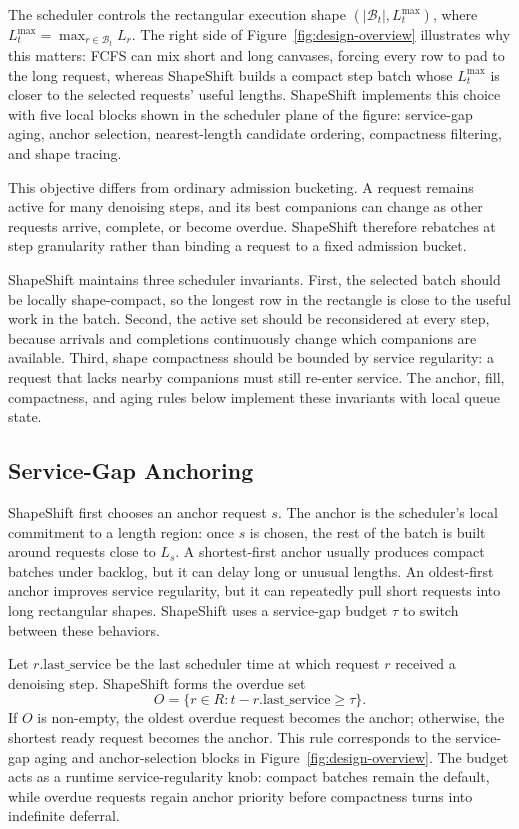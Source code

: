 \documentclass[a4paper]{llncs}
\begin{document}
The scheduler controls the rectangular execution shape $(|\mathcal{B}_t|,L_t^{\max})$, where $L_t^{\max}=\max_{r\in\mathcal{B}_t}L_r$. The right side of Figure~\ref{fig:design-overview} illustrates why this matters: FCFS can mix short and long canvases, forcing every row to pad to the long request, whereas ShapeShift builds a compact step batch whose $L_t^{\max}$ is closer to the selected requests' useful lengths. ShapeShift implements this choice with five local blocks shown in the scheduler plane of the figure: service-gap aging, anchor selection, nearest-length candidate ordering, compactness filtering, and shape tracing.

This objective differs from ordinary admission bucketing. A request remains active for many denoising steps, and its best companions can change as other requests arrive, complete, or become overdue. ShapeShift therefore rebatches at step granularity rather than binding a request to a fixed admission bucket.

ShapeShift maintains three scheduler invariants. First, the selected batch should be locally shape-compact, so the longest row in the rectangle is close to the useful work in the batch. Second, the active set should be reconsidered at every step, because arrivals and completions continuously change which companions are available. Third, shape compactness should be bounded by service regularity: a request that lacks nearby companions must still re-enter service. The anchor, fill, compactness, and aging rules below implement these invariants with local queue state.

\subsection{Service-Gap Anchoring}
\label{sec:anchoring}

ShapeShift first chooses an anchor request $s$. The anchor is the scheduler's local commitment to a length region: once $s$ is chosen, the rest of the batch is built around requests close to $L_s$. A shortest-first anchor usually produces compact batches under backlog, but it can delay long or unusual lengths. An oldest-first anchor improves service regularity, but it can repeatedly pull short requests into long rectangular shapes. ShapeShift uses a service-gap budget $\tau$ to switch between these behaviors.

Let $r.\mathrm{last\_service}$ be the last scheduler time at which request $r$ received a denoising step. ShapeShift forms the overdue set
\[
  O=\{r\in R: t-r.\mathrm{last\_service}\ge \tau\}.
\]
If $O$ is non-empty, the oldest overdue request becomes the anchor; otherwise, the shortest ready request becomes the anchor. This rule corresponds to the service-gap aging and anchor-selection blocks in Figure~\ref{fig:design-overview}. The budget acts as a runtime service-regularity knob: compact batches remain the default, while overdue requests regain anchor priority before compactness turns into indefinite deferral.
\end{document}
